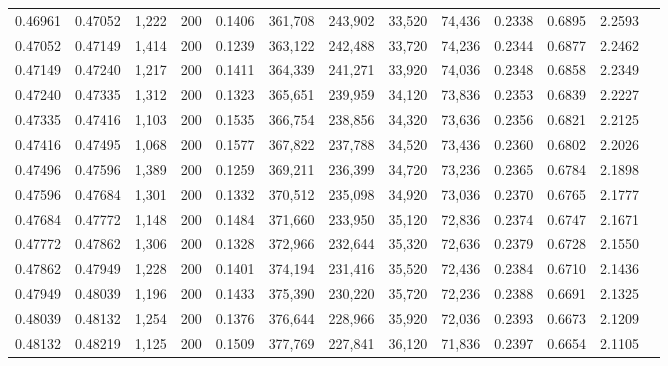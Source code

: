 \begin{tabular}{rrrrrrrrrrrrr}
0.46961 & 0.47052 & 1,222 & 200 &                                     0.1406 & 361,708 & 243,902 &  33,520 &  74,436 & 0.2338 & 0.6895 & 2.2593 \\
0.47052 & 0.47149 & 1,414 & 200 &                                     0.1239 & 363,122 & 242,488 &  33,720 &  74,236 & 0.2344 & 0.6877 & 2.2462 \\
0.47149 & 0.47240 & 1,217 & 200 &                                     0.1411 & 364,339 & 241,271 &  33,920 &  74,036 & 0.2348 & 0.6858 & 2.2349 \\
0.47240 & 0.47335 & 1,312 & 200 &                                     0.1323 & 365,651 & 239,959 &  34,120 &  73,836 & 0.2353 & 0.6839 & 2.2227 \\
0.47335 & 0.47416 & 1,103 & 200 &                                     0.1535 & 366,754 & 238,856 &  34,320 &  73,636 & 0.2356 & 0.6821 & 2.2125 \\
0.47416 & 0.47495 & 1,068 & 200 &                                     0.1577 & 367,822 & 237,788 &  34,520 &  73,436 & 0.2360 & 0.6802 & 2.2026 \\
0.47496 & 0.47596 & 1,389 & 200 &                                     0.1259 & 369,211 & 236,399 &  34,720 &  73,236 & 0.2365 & 0.6784 & 2.1898 \\
0.47596 & 0.47684 & 1,301 & 200 &                                     0.1332 & 370,512 & 235,098 &  34,920 &  73,036 & 0.2370 & 0.6765 & 2.1777 \\
0.47684 & 0.47772 & 1,148 & 200 &                                     0.1484 & 371,660 & 233,950 &  35,120 &  72,836 & 0.2374 & 0.6747 & 2.1671 \\
0.47772 & 0.47862 & 1,306 & 200 &                                     0.1328 & 372,966 & 232,644 &  35,320 &  72,636 & 0.2379 & 0.6728 & 2.1550 \\
0.47862 & 0.47949 & 1,228 & 200 &                                     0.1401 & 374,194 & 231,416 &  35,520 &  72,436 & 0.2384 & 0.6710 & 2.1436 \\
0.47949 & 0.48039 & 1,196 & 200 &                                     0.1433 & 375,390 & 230,220 &  35,720 &  72,236 & 0.2388 & 0.6691 & 2.1325 \\
0.48039 & 0.48132 & 1,254 & 200 &                                     0.1376 & 376,644 & 228,966 &  35,920 &  72,036 & 0.2393 & 0.6673 & 2.1209 \\
0.48132 & 0.48219 & 1,125 & 200 &                                     0.1509 & 377,769 & 227,841 &  36,120 &  71,836 & 0.2397 & 0.6654 & 2.1105 \\

\end{tabular}
